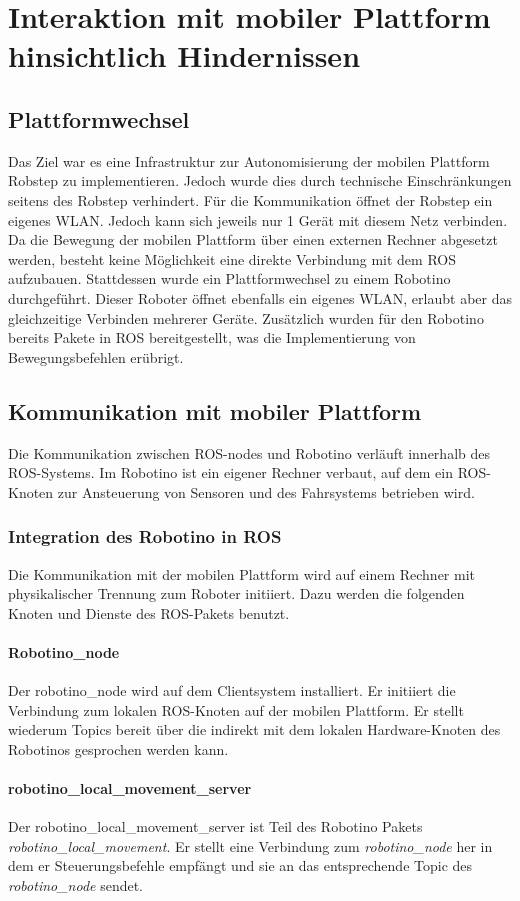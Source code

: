 \chapter{Interaktion mit mobiler Plattform hinsichtlich Hindernissen}
	\section{Plattformwechsel}
	Das Ziel war es eine Infrastruktur zur Autonomisierung der mobilen Plattform Robstep zu implementieren. Jedoch wurde dies durch technische Einschränkungen seitens des Robstep verhindert. Für die Kommunikation öffnet der Robstep ein eigenes WLAN. Jedoch kann sich jeweils nur 1 Gerät mit diesem Netz verbinden. Da die Bewegung der mobilen Plattform über einen externen Rechner abgesetzt werden, besteht keine Möglichkeit eine direkte Verbindung mit dem ROS aufzubauen. Stattdessen wurde ein Plattformwechsel zu einem Robotino durchgeführt. Dieser Roboter öffnet ebenfalls ein eigenes WLAN, erlaubt aber das gleichzeitige Verbinden mehrerer Geräte. Zusätzlich wurden für den Robotino bereits Pakete in ROS bereitgestellt, was die Implementierung von Bewegungsbefehlen erübrigt.

	\section{Kommunikation mit mobiler Plattform}
	Die Kommunikation zwischen ROS-nodes und Robotino verläuft innerhalb des ROS-Systems. Im Robotino ist ein eigener Rechner verbaut, auf dem ein ROS-Knoten zur Ansteuerung von Sensoren und des Fahrsystems betrieben wird.
		\subsection{Integration des Robotino in ROS}
		Die Kommunikation mit der mobilen Plattform wird auf einem Rechner mit physikalischer Trennung zum Roboter initiiert. Dazu werden die folgenden Knoten und Dienste des ROS-Pakets benutzt.
		\subsubsection{Robotino\_node}
		Der robotino\_node wird auf dem Clientsystem installiert. Er initiiert die Verbindung zum lokalen ROS-Knoten auf der mobilen Plattform. Er stellt wiederum Topics bereit über die indirekt mit dem lokalen Hardware-Knoten des Robotinos gesprochen werden kann.
		\subsubsection{robotino\_local\_movement\_server}
		Der robotino\_local\_movement\_server ist Teil des Robotino Pakets \textit{robotino\_local\_movement}. Er stellt eine Verbindung zum \textit{robotino\_node} her in dem er Steuerungsbefehle empfängt und sie an das entsprechende Topic des \textit{robotino\_node} sendet.
